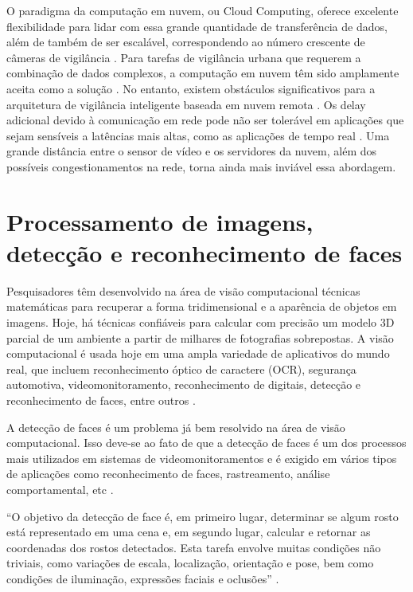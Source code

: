 O paradigma da computação em nuvem, ou Cloud Computing, oferece excelente flexibilidade para lidar com essa grande quantidade de transferência de dados, além de também de ser escalável, correspondendo ao número crescente de câmeras de vigilância \cite{Nikouei2018}. Para tarefas de vigilância urbana que requerem a combinação de dados complexos, a computação em nuvem têm sido amplamente aceita como a solução \cite{Chen2016}. No entanto, existem obstáculos significativos para a arquitetura de vigilância inteligente baseada em nuvem remota \cite{Nikouei2018}. Os delay adicional devido à comunicação em rede pode não ser tolerável em aplicações que sejam sensíveis a latências mais altas, como as aplicações de tempo real \cite{Chen2016}. Uma grande distância entre o sensor de vídeo e os servidores da nuvem, além dos possíveis congestionamentos na rede, torna ainda mais inviável essa abordagem.

\section{Processamento de imagens, detecção e reconhecimento de faces}
Pesquisadores têm desenvolvido na área de visão computacional técnicas matemáticas para recuperar a forma tridimensional e a aparência de objetos em imagens. Hoje, há técnicas confiáveis para calcular com precisão um modelo 3D parcial de um ambiente a partir de milhares de fotografias sobrepostas. A visão computacional é usada hoje em uma ampla variedade de aplicativos do mundo real, que incluem reconhecimento óptico de caractere (OCR), segurança automotiva, videomonitoramento, reconhecimento de digitais, detecção e reconhecimento de faces, entre outros \cite{Szeliski2011}.

A detecção de faces é um problema já bem resolvido na área de visão computacional. Isso deve-se ao fato de que a detecção de faces é um dos processos mais utilizados em sistemas de videomonitoramentos e é exigido em vários tipos de aplicações como reconhecimento de faces, rastreamento, análise comportamental, etc \cite{Zafeiriou2015}.

“O objetivo da detecção de face é, em primeiro lugar, determinar se algum rosto está representado em uma cena e, em segundo lugar, calcular e retornar as coordenadas dos rostos detectados. Esta tarefa envolve muitas condições não triviais, como variações de escala, localização, orientação e pose, bem como condições de iluminação, expressões faciais e oclusões” \cite{Tsakanikas2018}.

